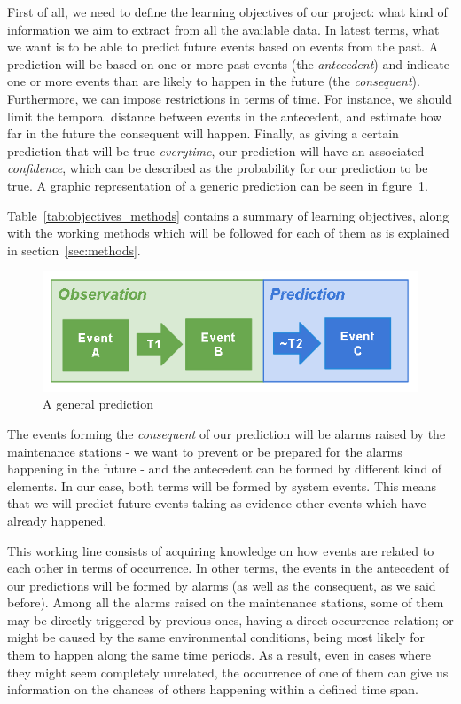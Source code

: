 First of all, we need to define the learning objectives of our project: what kind of information we aim to extract from all the available data. In latest terms, what we want is to be able to predict future events based on events from the past. A prediction will be based on one or more past events (the \emph{antecedent}) and indicate one or more events than are likely to happen in the future (the \emph{consequent}). Furthermore, we can impose restrictions in terms of time. For instance, we should limit the temporal distance between events in the antecedent, and estimate how far in the future the consequent will happen. Finally, as giving a certain prediction that will be true \emph{everytime}, our prediction will have an associated \emph{confidence}, which can be described as the probability for our prediction to be true. A graphic representation of a generic prediction can be seen in figure~\ref{fig:ass_rule}.

Table~\ref{tab:objectives_methods} contains a summary of learning objectives, along with the working methods which will be followed for each of them as is explained in section~\ref{sec:methods}.

\begin{figure}[hbtp]
\includegraphics[width=\textwidth]{./img/association_rules.png}
\caption{A general prediction} \label{fig:ass_rule}
\end{figure}


The events forming the \emph{consequent} of our prediction will be alarms raised by the maintenance stations - we want to prevent or be prepared for the alarms happening in the future - and the antecedent can be formed by different kind of elements. In our case, both terms will be formed by system events. This means that we will predict future events taking as evidence other events which have already happened.

This working line consists of acquiring knowledge on how events are related to each other in terms of occurrence. In other terms, the events in the antecedent of our predictions will be formed by alarms (as well as the consequent, as we said before). Among all the alarms raised on the maintenance stations, some of them may be directly triggered by previous ones, having a direct occurrence relation; or might be caused by the same environmental conditions, being most likely for them to happen along the same time periods. As a result, even in cases where they might seem completely unrelated, the occurrence of one of them can give us information on the chances of others happening within a defined time span.

